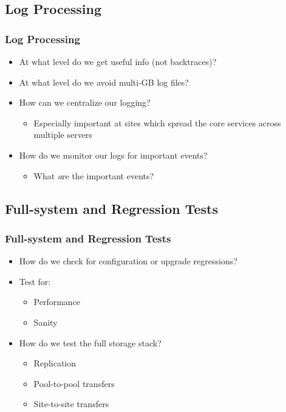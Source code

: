 \documentclass{beamer}
\begin{document}
\subsection{Log Processing}
\begin{frame}
\frametitle{Log Processing}
\begin{itemize}
    \item At what level do we get useful info (not backtraces)?
    \item At what level do we avoid multi-GB log files?
    \item How can we centralize our logging?
    \begin{itemize}
        \item Especially important at sites which spread the core services across multiple servers
    \end{itemize}
    \item How do we monitor our logs for important events?
    \begin{itemize}
        \item What {\emph are} the important events?
    \end{itemize}
\end{itemize}
\end{frame}

\subsection[Testing]{Full-system and Regression Tests}
\begin{frame}
\frametitle{Full-system and Regression Tests}
\begin{itemize}
    \item How do we check for configuration or upgrade regressions?
    \item Test for:
    \begin{itemize}
        \item Performance
        \item Sanity
    \end{itemize}
    \item How do we test the full storage stack?
    \begin{itemize}
        \item Replication
        \item Pool-to-pool transfers
        \item Site-to-site transfers
    \end{itemize}
\end{itemize}
\end{frame}
\end{document}
